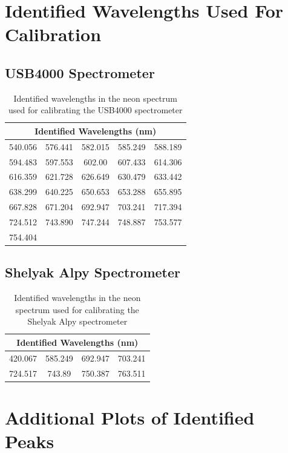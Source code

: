 \documentclass{article}
\begin{document}
\appendix
\begin{appendices}
\section{Identified Wavelengths Used For Calibration}
\label{app:known_wavelengths}
\subsection{USB4000 Spectrometer}
\label{app:identified_peaks}
\begin{table}[H]
  \centering
  \begin{tabular}{|c|c|c|c|c|}
  \hline
  \multicolumn{5}{|c|}{Identified Wavelengths (nm)} \\
  \hline
  540.056 & 576.441 & 582.015 & 585.249 & 588.189 \\
  \hline
  594.483 & 597.553 & 602.00 & 607.433 & 614.306 \\
  \hline
  616.359 & 621.728 & 626.649 & 630.479 & 633.442 \\
  \hline
  638.299 & 640.225 & 650.653 & 653.288 & 655.895 \\
  \hline
  667.828 & 671.204 & 692.947 & 703.241 & 717.394 \\
  \hline
  724.512 & 743.890 & 747.244 & 748.887 & 753.577 \\
  \hline
  754.404 & & & & \\
  \hline
  \end{tabular}
  \caption{Identified wavelengths in the neon spectrum used for calibrating the USB4000 spectrometer}
\end{table}
\subsection{Shelyak Alpy Spectrometer}
\begin{table}[h]
  \centering
  \begin{tabular}{|c|c|c|c|}
  \hline
  \multicolumn{4}{|c|}{Identified Wavelengths (nm)} \\
  \hline
  420.067 & 585.249 & 692.947 & 703.241 \\
  \hline
  724.517 & 743.89 & 750.387 & 763.511 \\
  \hline
  \end{tabular}
  \caption{Identified wavelengths in the neon spectrum used for calibrating the Shelyak Alpy spectrometer}
\end{table}

\section{Additional Plots of Identified Peaks}
\label{app:peaks}


\end{appendices}
\end{document}
